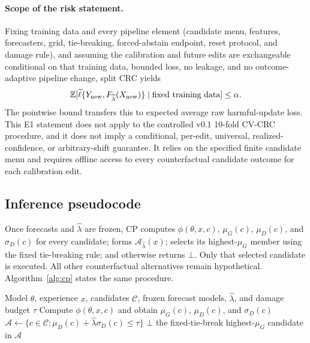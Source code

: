 \documentclass{article} %
\begin{document}
\paragraph{Scope of the risk statement.}\label{sec:risk_scope}
Fixing training data and every pipeline element (candidate menu, features,
forecasters, grid, tie-breaking, forced-abstain endpoint, reset protocol, and
damage rule), and assuming the calibration and future edits are exchangeable
conditional on that training data, bounded loss, no leakage, and no
outcome-adaptive pipeline change, split CRC yields
\[
\mathbb E[\widetilde\ell\{Y_{\rm new},F_{\widehat\lambda}(X_{\rm new})\}
\mid\text{fixed training data}]\leq\alpha.
\]
The pointwise bound transfers this to expected average raw harmful-update loss.
This E1 statement does not apply to the controlled v0.1 10-fold CV-CRC
procedure, and it does not imply a conditional, per-edit, universal,
realized-confidence, or arbitrary-shift guarantee. It relies on the specified
finite candidate menu and requires offline access to every counterfactual
candidate outcome for each calibration edit.

\subsection{Inference pseudocode}
\label{sec:inference}

Once forecasts and $\widehat\lambda$ are frozen, CP computes
$\phi(\theta,x,c)$, $\mu_G(c)$, $\mu_D(c)$, and $\sigma_D(c)$ for every
candidate; forms $\mathcal A_{\widehat\lambda}(x)$; selects its
highest-$\mu_G$ member using the fixed tie-breaking rule; and otherwise
returns $\bot$. Only that selected candidate is executed. All other
counterfactual alternatives remain hypothetical. Algorithm~\ref{alg:cp}
states the same procedure.

\begin{algorithm}[t]
\caption{Counterfactual Plasticity}
\label{alg:cp}
\makeatletter\let\AND\@undefined\makeatother
\begin{algorithmic}[1]
\REQUIRE Model $\theta$, experience $x$, candidates $\mathcal C$, frozen
forecast models, $\widehat\lambda$, and damage budget $\tau$
    \STATE Compute $\phi(\theta,x,c)$ and obtain $\mu_G(c)$, $\mu_D(c)$, and
    $\sigma_D(c)$
\ENDFOR
\STATE $\mathcal A\leftarrow\{c\in\mathcal C:\mu_D(c)+
\widehat\lambda\sigma_D(c)\leq\tau\}$
    \RETURN $\bot$
\ELSE
    \RETURN the fixed-tie-break highest-$\mu_G$ candidate in $\mathcal A$
\ENDIF
\end{algorithmic}
\end{algorithm}
\end{document}
